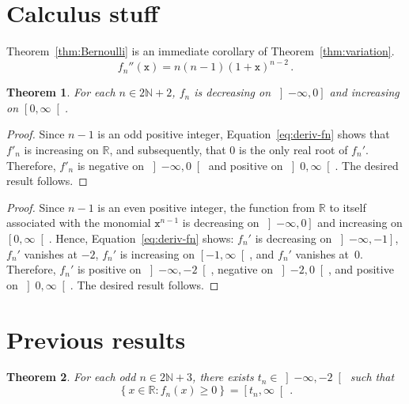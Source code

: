 \documentclass[12pt]{article}
\newcommand{\bR}{\mathbb{R}}
\newcommand{\bN}{\mathbb{N}}
\newcommand{\gtint}[1]{\left] #1, \infty \right[}
\newcommand{\geint}[1]{\left[ #1, \infty \right[}
\newcommand{\ltint}[1]{\left]- \infty, #1 \right[}
\newcommand{\leint}[1]{\left]- \infty, #1 \right]}
\newcommand{\ttx}{\mathtt{x}}
\newtheorem{theorem}{Theorem}
\begin{document}
 

 
 \section{Calculus stuff}


Theorem~\ref{thm:Bernoulli} is an immediate corollary of Theorem~\ref{thm:variation}.
 $$
  f_n''(\ttx)  = n (n - 1) {(1 + \ttx)}^{n - 2} \,.
  $$


 \begin{theorem} \label{thm:variation-even}
   For each $n \in 2 \bN + 2$,
   $f_n$ is
   decreasing on $\leint{0}$ and
   increasing on $\geint{0}$.
 \end{theorem}

 \begin{proof}
   Since $n - 1$ is an odd positive integer,
   Equation~\eqref{eq:deriv-fn} shows that
   $f'_n$ is increasing on $\bR$,
   and subsequently, that
   $0$ is the only real root of $f_n'$.
   Therefore,
   $f'_n$ is negative on $\ltint{0}$
   and 
   positive on $\gtint{0}$.
   The desired result follows.
 \end{proof}



 \begin{proof}
   Since $n - 1$ is an even positive integer,
   the function from $\bR$ to itself associated with the monomial $\ttx^{n - 1}$ is
   decreasing on $\leint{0}$ and
   increasing on $\geint{0}$.
   Hence, 
   Equation~\eqref{eq:deriv-fn} shows: 
   $f_n'$ is decreasing on $\leint{- 1}$,
   $f_n'$ vanishes at $- 2$,
   $f_n'$ is increasing on $\geint{- 1}$, and
   $f_n'$ vanishes at~$0$.
   Therefore, $f_n'$ is positive on $\ltint{- 2}$,
   negative on $\left]- 2, 0 \right[$, and
   positive on $\gtint{0}$.
   The desired result follows.
 \end{proof}
 
 

 \section{Previous results} 
 
 \begin{theorem} \label{thm:tipping-point}
   For each odd  $n \in 2 \bN + 3$,
   there exists $t_n \in \ltint{- 2}$ such that
 \begin{equation} \label{eq:def-tn}
 \left\{ x \in \bR : f_n(x) \ge 0 \right\}
 =
 \geint{t_n} \,. 
 \end{equation} 
 \end{theorem} 
\end{document}
